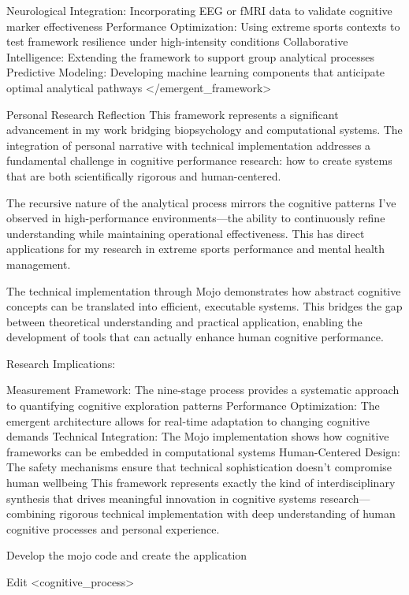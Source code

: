 {Neurological Integration: Incorporating EEG or fMRI data to validate cognitive marker effectiveness
Performance Optimization: Using extreme sports contexts to test framework resilience under high-intensity conditions
Collaborative Intelligence: Extending the framework to support group analytical processes
Predictive Modeling: Developing machine learning components that anticipate optimal analytical pathways
</emergent_framework>

Personal Research Reflection
This framework represents a significant advancement in my work bridging biopsychology and computational systems. The integration of personal narrative with technical implementation addresses a fundamental challenge in cognitive performance research: how to create systems that are both scientifically rigorous and human-centered.

The recursive nature of the analytical process mirrors the cognitive patterns I've observed in high-performance environments—the ability to continuously refine understanding while maintaining operational effectiveness. This has direct applications for my research in extreme sports performance and mental health management.

The technical implementation through Mojo demonstrates how abstract cognitive concepts can be translated into efficient, executable systems. This bridges the gap between theoretical understanding and practical application, enabling the development of tools that can actually enhance human cognitive performance.

Research Implications:

Measurement Framework: The nine-stage process provides a systematic approach to quantifying cognitive exploration patterns
Performance Optimization: The emergent architecture allows for real-time adaptation to changing cognitive demands
Technical Integration: The Mojo implementation shows how cognitive frameworks can be embedded in computational systems
Human-Centered Design: The safety mechanisms ensure that technical sophistication doesn't compromise human wellbeing
This framework represents exactly the kind of interdisciplinary synthesis that drives meaningful innovation in cognitive systems research—combining rigorous technical implementation with deep understanding of human cognitive processes and personal experience.




Develop the mojo code and create the application

Edit
<cognitive_process>

}
